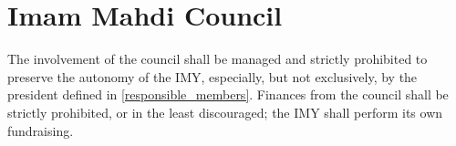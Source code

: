 \documentclass{article}
\begin{document}
\section{Imam Mahdi Council}
\label{council}
The involvement of the council shall be managed and strictly prohibited to preserve the autonomy of the IMY, especially, but not exclusively, by the president defined in \ref{responsible_members}.
Finances from the council shall be strictly prohibited, or in the least discouraged; the IMY shall perform its own fundraising.


\end{document}
